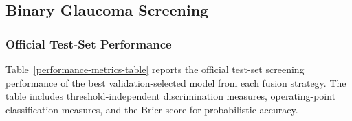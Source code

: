 \documentclass[sn-mathphys]{sn-jnl}%
\theoremstyle{thmstyleone}%
\theoremstyle{thmstyletwo}%
\theoremstyle{thmstylethree}%
\begin{document}
\subsection{Binary Glaucoma Screening}
\label{subsec:screening_results}

\subsubsection{Official Test-Set Performance}
\label{subsubsec:screening_test_results}

Table~\ref{performance-metrics-table} reports the official test-set screening performance of the best validation-selected model from each fusion strategy. The table includes threshold-independent discrimination measures, operating-point classification measures, and the Brier score for probabilistic accuracy.

\begin{table}[!t]
    \centering
    \caption{Official test-set performance of the selected models for binary glaucoma screening.}
    \label{performance-metrics-table}
    \scriptsize
    \tiny
\end{table}
\end{document}
